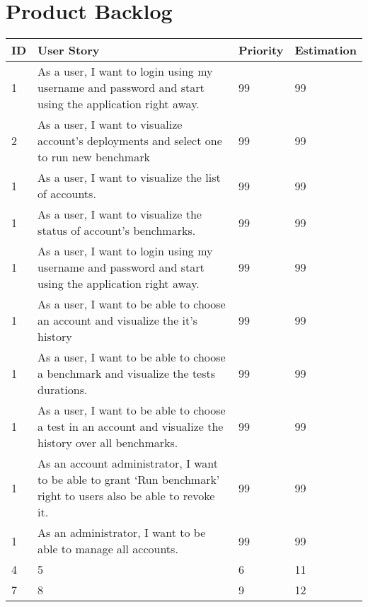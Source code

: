 \section{Product Backlog}
\begin{center}
  \begin{tabular}{ | p{1cm}  | p{9cm}  | p{2cm} | p{2cm}| }
    \hline
    ID & User Story                                                                                                     & Priority        & Estimation\\ \hline
    1 & As a user, I want to login using my username and password and start using the application right away.           & 99              & 99\\ \hline
    2 & As a user, I want to visualize account’s deployments  and select one to run new benchmark                       & 99              & 99\\ \hline
    1 & As a user, I want to visualize the list of accounts.                                                            & 99              & 99\\ \hline
    1 & As a user, I want to visualize the status of account’s benchmarks.                                              & 99              & 99\\ \hline
    1 & As a user, I want to login using my username and password and start using the application right away.           & 99              & 99\\ \hline
    1 & As a user, I want to be able to choose an account and visualize the it’s history                                & 99              & 99\\ \hline
    1 & As a user, I want to be able to choose a benchmark and visualize the tests durations.                           & 99              & 99\\ \hline
    1 & As a user, I want to be able to choose a test in an account and visualize the history over all benchmarks.  & 99 & 99\\ \hline
    1 & As an account administrator, I want to be able to grant ‘Run benchmark’  right to users also be able to revoke it. & 99 & 99\\ \hline
    1 & As an administrator, I want to be able to manage all accounts.& 99 & 99\\ \hline
    4 & 5 & 6 & 11\\ \hline
    7 & 8 & 9 & 12\\
    \hline
  \end{tabular}
\end{center}

